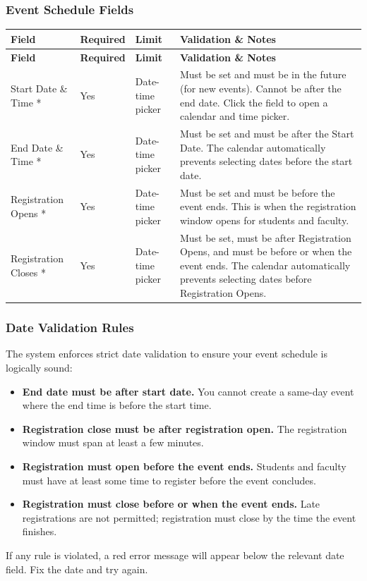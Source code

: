 \documentclass[12pt, a4paper]{article}
\newenvironment{fieldtable}{%
  \begin{longtable}{|>{\raggedright\arraybackslash}p{2.2cm}|>{\centering\arraybackslash}p{1.8cm}|>{\raggedright\arraybackslash}p{2.2cm}|>{\raggedright\arraybackslash}p{7.3cm}|}
  \hline
  \rowcolor{lightgray}
  \textbf{Field} & \textbf{Required} & \textbf{Limit} & \textbf{Validation \& Notes} \\
  \hline
  \endfirsthead
  \hline
  \rowcolor{lightgray}
  \textbf{Field} & \textbf{Required} & \textbf{Limit} & \textbf{Validation \& Notes} \\
  \hline
  \endhead
  \hline
  \endfoot
}{%
  \end{longtable}
}
\newcommand{\fieldrow}[4]{%
  #1 & #2 & #3 & #4 \\ \hline
}
\begin{document}
\subsubsection{Event Schedule Fields}

\begin{fieldtable}
  \fieldrow{Start Date \& Time *}{Yes}{Date-time picker}{Must be set and must be in the future (for new events). Cannot be after the end date. Click the field to open a calendar and time picker.}
  \fieldrow{End Date \& Time *}{Yes}{Date-time picker}{Must be set and must be after the Start Date. The calendar automatically prevents selecting dates before the start date.}
  \fieldrow{Registration Opens *}{Yes}{Date-time picker}{Must be set and must be before the event ends. This is when the registration window opens for students and faculty.}
  \fieldrow{Registration Closes *}{Yes}{Date-time picker}{Must be set, must be after Registration Opens, and must be before or when the event ends. The calendar automatically prevents selecting dates before Registration Opens.}
\end{fieldtable}

\subsubsection{Date Validation Rules}

The system enforces strict date validation to ensure your event schedule is logically sound:

\begin{itemize}[leftmargin=1.5em]
  \item \textbf{End date must be after start date.} You cannot create a same-day event where the end time is before the start time.
  \item \textbf{Registration close must be after registration open.} The registration window must span at least a few minutes.
  \item \textbf{Registration must open before the event ends.} Students and faculty must have at least some time to register before the event concludes.
  \item \textbf{Registration must close before or when the event ends.} Late registrations are not permitted; registration must close by the time the event finishes.
\end{itemize}

If any rule is violated, a red error message will appear below the relevant date field. Fix the date and try again.
\end{document}
